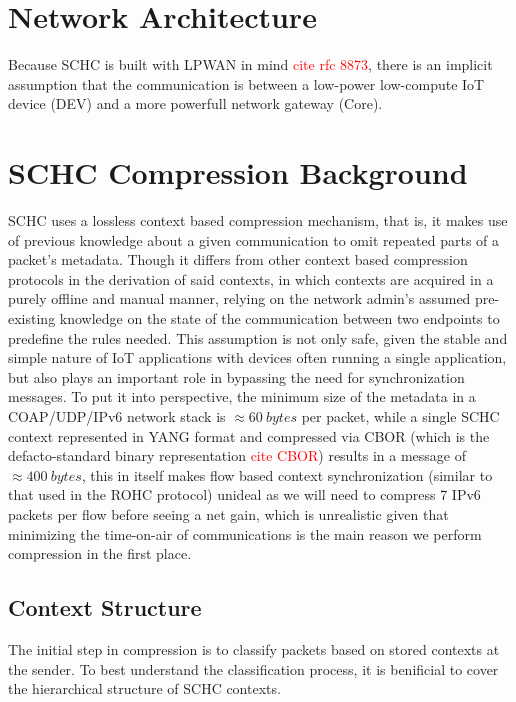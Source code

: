 \documentclass[cspaper]{IEEEtran}
\numberwithin{equation}{subsection}
\begin{document}
\section{Network Architecture}
	\par{
		Because SCHC is built with LPWAN in mind \textcolor{red}{cite rfc 8873}, there is an implicit assumption that the communication is between
		a low-power low-compute IoT device (DEV) and a more powerfull network gateway (Core).
	}
\section{SCHC Compression  Background}
	

	\par{
		SCHC uses a lossless context based compression mechanism, that is, it makes use of previous knowledge
		about a given communication to omit repeated parts of a packet's metadata. Though it
		differs from other context based compression protocols in the derivation of said contexts,
		in which contexts are acquired in a purely offline and manual manner, relying on the network admin's assumed
		pre-existing knowledge on the state of the communication between two endpoints to predefine the rules needed.
		This assumption is not only safe, given the stable and simple nature of IoT applications with devices often running a single application, but
		also plays an important role in bypassing the need for synchronization messages. To put it into perspective, the minimum size of the metadata in a 
		COAP/UDP/IPv6 network stack is $\approx 60 \ bytes$ per packet, while a single SCHC context represented in YANG format and compressed via CBOR 
		(which is the defacto-standard binary representation \textcolor{red}{cite CBOR}) results in 
		a message of $\approx 400 \ bytes$, this in itself makes flow based context synchronization (similar to that used in the ROHC protocol) unideal as we will need to compress
		7 IPv6 packets per flow before seeing a net gain, which is unrealistic given that minimizing the time-on-air of communications is 
		the main reason we perform compression in the first place.
	}
	
	\vspace{1em}
\subsection{Context Structure}
	\par{
		The initial step in compression is to classify packets based on stored contexts at the sender. 
		To best understand the classification process, it is benificial to cover the 
		hierarchical structure of SCHC contexts.
	}
\end{document}
